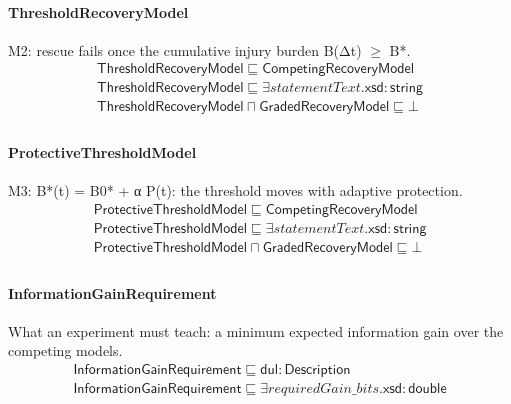 \documentclass[10pt]{article}
\begin{document}
\paragraph{ThresholdRecoveryModel} M2: rescue fails once the cumulative injury burden B(Δt) $\geq$ B*.
\[\begin{array}{l}
\mathsf{ThresholdRecoveryModel} \sqsubseteq  \mathsf{CompetingRecoveryModel} \\
\mathsf{ThresholdRecoveryModel} \sqsubseteq  \exists \mathit{statementText}.\mathsf{xsd{:}string} \\
\mathsf{ThresholdRecoveryModel} \sqcap  \mathsf{GradedRecoveryModel} \sqsubseteq  \bot  \\
\end{array}\]
\paragraph{ProtectiveThresholdModel} M3: B*(t) = B0* + α P(t): the threshold moves with adaptive protection.
\[\begin{array}{l}
\mathsf{ProtectiveThresholdModel} \sqsubseteq  \mathsf{CompetingRecoveryModel} \\
\mathsf{ProtectiveThresholdModel} \sqsubseteq  \exists \mathit{statementText}.\mathsf{xsd{:}string} \\
\mathsf{ProtectiveThresholdModel} \sqcap  \mathsf{GradedRecoveryModel} \sqsubseteq  \bot  \\
\end{array}\]
\paragraph{InformationGainRequirement} What an experiment must teach: a minimum expected information gain over the competing models.
\[\begin{array}{l}
\mathsf{InformationGainRequirement} \sqsubseteq  \mathsf{dul{:}Description} \\
\mathsf{InformationGainRequirement} \sqsubseteq  \exists \mathit{requiredGain\_bits}.\mathsf{xsd{:}double} \\
\end{array}\]
\end{document}
